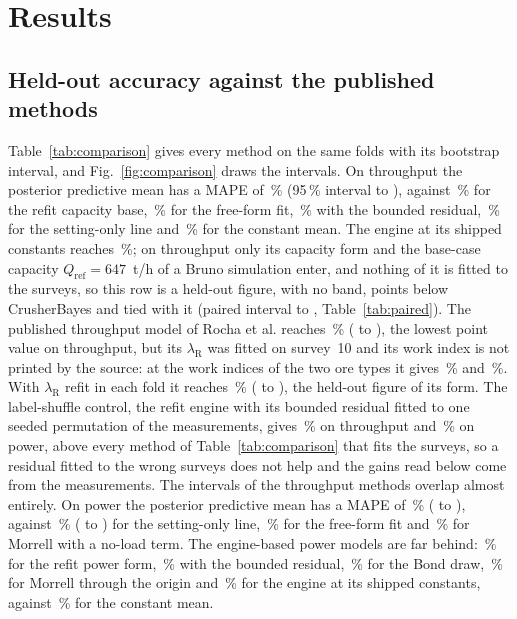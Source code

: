 \documentclass[journal]{IEEEtran}
\newcommand{\pct}{\,\%}
\begin{document}
\section{Results}\label{sec:results}

\subsection{Held-out accuracy against the published methods}

Table~\ref{tab:comparison} gives every method on the same folds with its bootstrap interval, and Fig.~\ref{fig:comparison}
draws the intervals. On throughput the posterior predictive mean has a MAPE of \cbTphMape\pct{} (95\pct{} interval
\cbTphMapeLo{} to \cbTphMapeHi), against \backTphMapeBoot\pct{} for the refit capacity base, \freeTphMapeBoot\pct{} for the
free-form fit, \residTphMapeBoot\pct{} with the bounded residual, \blinTphMapeBoot\pct{} for the setting-only line and
\constTphMapeBoot\pct{} for the constant mean. The engine at its shipped constants reaches \pubTphMapeBoot\pct{}; on
throughput only its capacity form and the base-case capacity $Q_{\mathrm{ref}}=647$~t/h of a Bruno simulation enter, and
nothing of it is fitted to the surveys, so this row is a held-out figure, with no band, \dPubTph{} points below CrusherBayes
and tied with it (paired interval \dPubTphLo{} to \dPubTphHi, Table~\ref{tab:paired}). The published throughput model of
Rocha et al. reaches \rochapubTphMapeBoot\pct{} (\rochapubTphMapeLo{} to \rochapubTphMapeHi), the lowest point value on
throughput, but its $\lambda_{\mathrm R}$ was fitted on survey~10 and its work index is not printed by the source: at the
work indices of the two ore types it gives \rochaPubMapeLo\pct{} and \rochaPubMapeHi\pct. With $\lambda_{\mathrm R}$ refit in
each fold it reaches \rochafitTphMapeBoot\pct{} (\rochafitTphMapeLo{} to \rochafitTphMapeHi), the held-out figure of its
form. The label-shuffle control, the refit engine with its bounded residual fitted to one seeded permutation of the
measurements, gives \shuffleTphMape\pct{} on throughput and \shuffleKwMape\pct{} on power, above every method of
Table~\ref{tab:comparison} that fits the surveys, so a residual fitted to the wrong surveys does not help and the gains read
below come from the measurements. The intervals of the throughput methods overlap almost entirely. On power the
posterior predictive mean has a MAPE of \cbKwMape\pct{} (\cbKwMapeLo{} to \cbKwMapeHi), against \blinKwMapeBoot\pct{}
(\blinKwMapeLo{} to \blinKwMapeHi) for the setting-only line, \freeKwMapeBoot\pct{} for the free-form fit and
\mnlKwMapeBoot\pct{} for Morrell with a no-load term. The engine-based power models are far behind: \backKwMapeBoot\pct{}
for the refit power form, \residKwMapeBoot\pct{} with the bounded residual, \bondKwMapeBoot\pct{} for the Bond draw,
\morKwMapeBoot\pct{} for Morrell through the origin and \pubKwMapeBoot\pct{} for the engine at its shipped constants,
against \constKwMapeBoot\pct{} for the constant mean.
\end{document}
